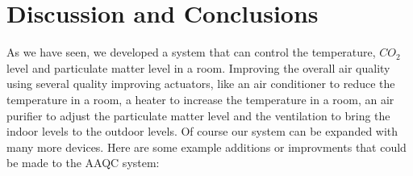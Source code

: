 \section{Discussion and Conclusions}\label{sec:discussion-and-conclusions}

As we have seen, we developed a system that can control the temperature, $CO_2$ level and particulate matter level in a room.
Improving the overall air quality using several quality improving actuators, like an air conditioner to reduce the temperature in a room, a heater to increase the temperature in a room, an air purifier to adjust the particulate matter level and the ventilation to bring the indoor levels to the outdoor levels.
Of course our system can be expanded with many more devices.
Here are some example additions or improvments that could be made to the AAQC system:


